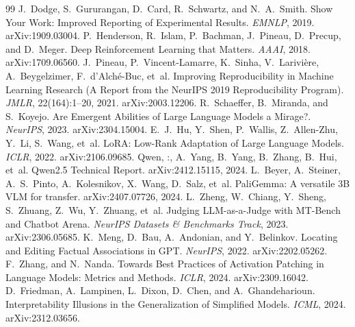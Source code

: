 \documentclass{article}
\begin{document}
\begin{thebibliography}{99}
 J.~Dodge, S.~Gururangan, D.~Card, R.~Schwartz, and N.~A.~Smith. Show Your Work: Improved Reporting of Experimental Results. \emph{EMNLP}, 2019. arXiv:1909.03004.
 P.~Henderson, R.~Islam, P.~Bachman, J.~Pineau, D.~Precup, and D.~Meger. Deep Reinforcement Learning that Matters. \emph{AAAI}, 2018. arXiv:1709.06560.
 J.~Pineau, P.~Vincent-Lamarre, K.~Sinha, V.~Larivière, A.~Beygelzimer, F.~d'Alché-Buc, et~al. Improving Reproducibility in Machine Learning Research (A Report from the NeurIPS 2019 Reproducibility Program). \emph{JMLR}, 22(164):1--20, 2021. arXiv:2003.12206.
 R.~Schaeffer, B.~Miranda, and S.~Koyejo. Are Emergent Abilities of Large Language Models a Mirage?. \emph{NeurIPS}, 2023. arXiv:2304.15004.
 E.~J.~Hu, Y.~Shen, P.~Wallis, Z.~Allen-Zhu, Y.~Li, S.~Wang, et~al. LoRA: Low-Rank Adaptation of Large Language Models. \emph{ICLR}, 2022. arXiv:2106.09685.
 Qwen, :, A.~Yang, B.~Yang, B.~Zhang, B.~Hui, et~al. Qwen2.5 Technical Report. arXiv:2412.15115, 2024.
 L.~Beyer, A.~Steiner, A.~S.~Pinto, A.~Kolesnikov, X.~Wang, D.~Salz, et~al. PaliGemma: A versatile 3B VLM for transfer. arXiv:2407.07726, 2024.
 L.~Zheng, W.~Chiang, Y.~Sheng, S.~Zhuang, Z.~Wu, Y.~Zhuang, et~al. Judging LLM-as-a-Judge with MT-Bench and Chatbot Arena. \emph{NeurIPS Datasets \& Benchmarks Track}, 2023. arXiv:2306.05685.
 K.~Meng, D.~Bau, A.~Andonian, and Y.~Belinkov. Locating and Editing Factual Associations in GPT. \emph{NeurIPS}, 2022. arXiv:2202.05262.
 F.~Zhang, and N.~Nanda. Towards Best Practices of Activation Patching in Language Models: Metrics and Methods. \emph{ICLR}, 2024. arXiv:2309.16042.
 D.~Friedman, A.~Lampinen, L.~Dixon, D.~Chen, and A.~Ghandeharioun. Interpretability Illusions in the Generalization of Simplified Models. \emph{ICML}, 2024. arXiv:2312.03656.
\end{thebibliography}
\end{document}
